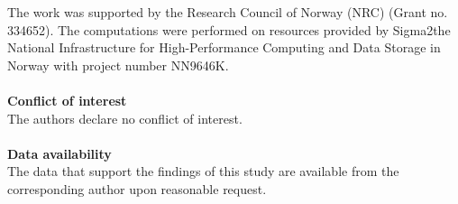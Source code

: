 \documentclass[a4paper,fleqn]{cas-sc}
\begin{document}
	The work was supported by the Research Council of Norway (NRC) (Grant no. 334652). The computations were performed on resources provided by Sigma2\textemdash the National Infrastructure for High-Performance Computing and Data Storage in Norway with project number NN9646K.\\
	\\
	{\bf{Conflict of interest}} \\
	
	The authors declare no conflict of interest. \\
	\\
	{\bf{Data availability}} \\
	

	The data that support the findings of this study are available from the corresponding author upon reasonable request. \\
	
\nolinenumbers



	
	
\end{document}
